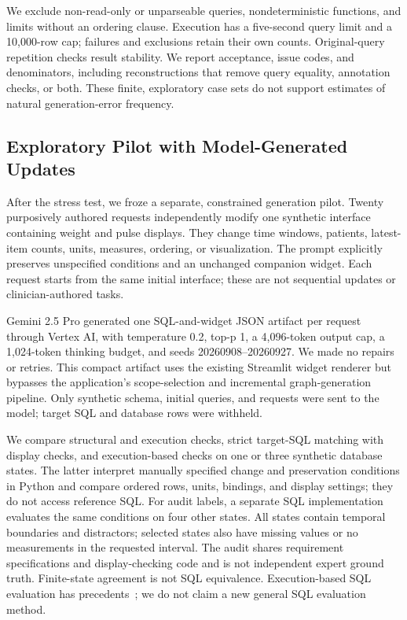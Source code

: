 \documentclass[manuscript,review,anonymous]{acmart}
\begin{document}
We exclude non-read-only or unparseable queries, nondeterministic functions, and limits without an ordering clause. Execution has a five-second query limit and a 10,000-row cap; failures and exclusions retain their own counts. Original-query repetition checks result stability. We report acceptance, issue codes, and denominators, including reconstructions that remove query equality, annotation checks, or both. These finite, exploratory case sets do not support estimates of natural generation-error frequency.

\subsection{Exploratory Pilot with Model-Generated Updates}
\label{sec:generated-pilot}

After the stress test, we froze a separate, constrained generation pilot. Twenty purposively authored requests independently modify one synthetic interface containing weight and pulse displays. They change time windows, patients, latest-item counts, units, measures, ordering, or visualization. The prompt explicitly preserves unspecified conditions and an unchanged companion widget. Each request starts from the same initial interface; these are not sequential updates or clinician-authored tasks.

Gemini 2.5 Pro generated one SQL-and-widget JSON artifact per request through Vertex AI, with temperature 0.2, top-p 1, a 4,096-token output cap, a 1,024-token thinking budget, and seeds 20260908--20260927. We made no repairs or retries. This compact artifact uses the existing Streamlit widget renderer but bypasses the application's scope-selection and incremental graph-generation pipeline. Only synthetic schema, initial queries, and requests were sent to the model; target SQL and database rows were withheld.

We compare structural and execution checks, strict target-SQL matching with display checks, and execution-based checks on one or three synthetic database states. The latter interpret manually specified change and preservation conditions in Python and compare ordered rows, units, bindings, and display settings; they do not access reference SQL. For audit labels, a separate SQL implementation evaluates the same conditions on four other states. All states contain temporal boundaries and distractors; selected states also have missing values or no measurements in the requested interval. The audit shares requirement specifications and display-checking code and is not independent expert ground truth. Finite-state agreement is not SQL equivalence. Execution-based SQL evaluation has precedents~\cite{zhong2020semantic}; we do not claim a new general SQL evaluation method.
\end{document}
